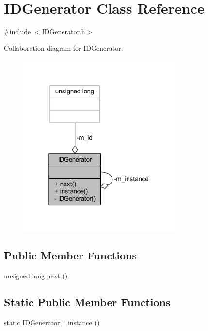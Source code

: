 \hypertarget{class_i_d_generator}{}\section{I\+D\+Generator Class Reference}
\label{class_i_d_generator}


{\ttfamily \#include $<$I\+D\+Generator.\+h$>$}



Collaboration diagram for I\+D\+Generator\+:\nopagebreak
\begin{figure}[H]
\begin{center}
\leavevmode
\includegraphics[width=235pt]{class_i_d_generator__coll__graph}
\end{center}
\end{figure}
\subsection*{Public Member Functions}
\begin{DoxyCompactItemize}
\item 
unsigned long \hyperlink{class_i_d_generator_a99d8cabb2ec6a17888a8ccbe9c85fee0}{next} ()
\end{DoxyCompactItemize}
\subsection*{Static Public Member Functions}
\begin{DoxyCompactItemize}
\item 
static \hyperlink{class_i_d_generator}{I\+D\+Generator} $\ast$ \hyperlink{class_i_d_generator_ad852c6dadc89e1020e4b3932f5a97bb3}{instance} ()
\end{DoxyCompactItemize}

